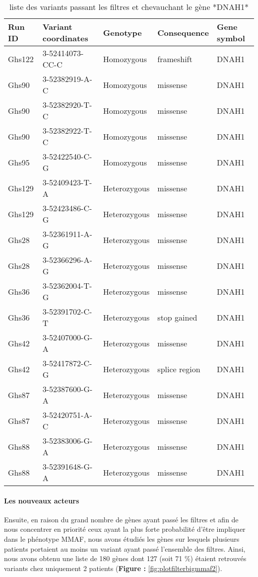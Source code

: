 \documentclass[12pt,twoside]{reedthesis}
\theoremstyle{definition}
\theoremstyle{definition}
\theoremstyle{remark}
\begin{document}
  \begin{longtable}[t]{lllll}
  \caption{\label{tab:tabdnah1}liste des variants passant les filtres et chevauchant le gène *DNAH1*}\\
  \toprule
  Run ID & Variant coordinates & Genotype & Consequence & Gene symbol\\
  \midrule
  Ghs122 & 3-52414073-CC-C & Homozygous & frameshift & DNAH1\\
  Ghs90 & 3-52382919-A-C & Homozygous & missense & DNAH1\\
  Ghs90 & 3-52382920-T-C & Homozygous & missense & DNAH1\\
  Ghs90 & 3-52382922-T-C & Homozygous & missense & DNAH1\\
  Ghs95 & 3-52422540-C-G & Homozygous & missense & DNAH1\\
  \addlinespace
  Ghs129 & 3-52409423-T-A & Heterozygous & missense & DNAH1\\
  Ghs129 & 3-52423486-C-G & Heterozygous & missense & DNAH1\\
  Ghs28 & 3-52361911-A-G & Heterozygous & missense & DNAH1\\
  Ghs28 & 3-52366296-A-G & Heterozygous & missense & DNAH1\\
  Ghs36 & 3-52362004-T-G & Heterozygous & missense & DNAH1\\
  \addlinespace
  Ghs36 & 3-52391702-C-T & Heterozygous & stop gained & DNAH1\\
  Ghs42 & 3-52407000-G-A & Heterozygous & missense & DNAH1\\
  Ghs42 & 3-52417872-C-G & Heterozygous & splice region & DNAH1\\
  Ghs87 & 3-52387600-G-A & Heterozygous & missense & DNAH1\\
  Ghs87 & 3-52420751-A-C & Heterozygous & missense & DNAH1\\
  \addlinespace
  Ghs88 & 3-52383006-G-A & Heterozygous & missense & DNAH1\\
  Ghs88 & 3-52391648-G-A & Heterozygous & missense & DNAH1\\
  \bottomrule
  \end{longtable}
  
  \newpage
  
  \paragraph{Les nouveaux acteurs}\label{les-nouveaux-acteurs}
  
  Ensuite, en raison du grand nombre de gènes ayant passé les filtres et
  afin de nous concentrer en priorité ceux ayant la plus forte probabilité
  d'être impliquer dans le phénotype MMAF, nous avons étudiés les gènes
  sur lesquels plusieurs patients portaient au moins un variant ayant
  passé l'ensemble des filtres. Ainsi, nous avons obtenu une liste de 180
  gènes dont 127 (soit 71 \%) étaient retrouvés variants chez uniquement 2
  patients (\textbf{Figure : }\ref{fig:plotfilterbigmmaf2}).
  
\end{document}

